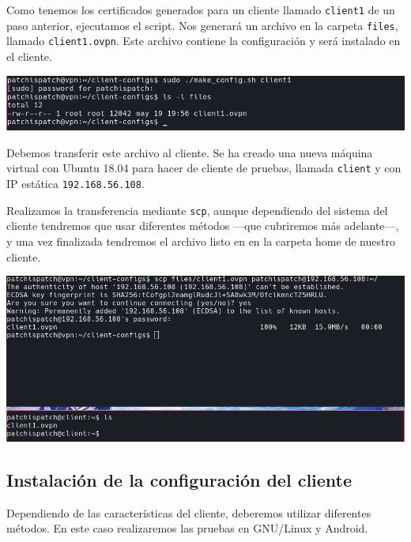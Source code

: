 \documentclass[11pt,a4paper]{article}
\begin{document}
Como tenemos los certificados generados para un cliente llamado \texttt{client1} de un paso anterior, ejecutamos el script. Nos generará un archivo en la carpeta \texttt{files}, llamado \texttt{client1.ovpn}. Este archivo contiene la configuración y será instalado en el cliente.

\medskip

\begin{center}
\includegraphics[scale=0.4]{make-config-client1.png}
\end{center}

\bigskip

Debemos transferir este archivo al cliente. Se ha creado una nueva máquina virtual con Ubuntu 18.04 para hacer de cliente de pruebas, llamada \texttt{client} y con IP estática \texttt{192.168.56.108}. 

\medskip

Realizamos la transferencia mediante \texttt{scp}, aunque dependiendo del sistema del cliente tendremos que usar diferentes métodos ---que cubriremos más adelante---, y una vez finalizada tendremos el archivo listo en en la carpeta home de nuestro cliente.

\medskip

\begin{center}
\includegraphics[scale=0.4]{scp-client1.png}
\end{center}

\medskip

\subsection{Instalación de la configuración del cliente}

Dependiendo de las características del cliente, deberemos utilizar diferentes métodos. En este caso realizaremos las pruebas en GNU/Linux y Android.
\end{document}
